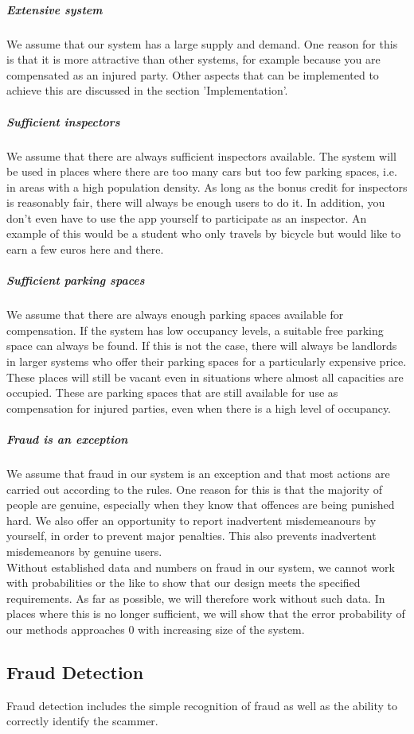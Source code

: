 \documentclass[
a4paper,     %
titlepage,   %
14pt         %
]{scrartcl}  %
\theoremstyle{mystyle}
\begin{document}
\subparagraph{Extensive system} We assume that our system has a large supply and demand. One reason for this is that it is more attractive than other systems, for example because you are compensated as an injured party. Other aspects that can be implemented to achieve this are discussed in the section 'Implementation'.

\subparagraph{Sufficient inspectors} We assume that there are always sufficient inspectors available. The system will be used in places where there are too many cars but too few parking spaces, i.e. in areas with a high population density. As long as the bonus credit for inspectors is reasonably fair, there will always be enough users to do it. In addition, you don't even have to use the app yourself to participate as an inspector. An example of this would be a student who only travels by bicycle but would like to earn a few euros here and there.

\subparagraph{Sufficient parking spaces} We assume that there are always enough parking spaces available for compensation. If the system has low occupancy levels, a suitable free parking space can always be found. If this is not the case, there will always be landlords in larger systems who offer their parking spaces for a particularly expensive price. These places will still be vacant even in situations where almost all capacities are occupied. These are parking spaces that are still available for use as compensation for injured parties, even when there is a high level of occupancy. 

\subparagraph{Fraud is an exception} We assume that fraud in our system is an exception and that most actions are carried out according to the rules. One reason for this is that the majority of people are genuine, especially when they know that offences are being punished hard. We also offer an opportunity to report inadvertent misdemeanours by yourself, in order to prevent major penalties. This also prevents inadvertent misdemeanors by genuine users.\\

Without established data and numbers on fraud in our system, we cannot work with probabilities or the like to show that our design meets the specified requirements. As far as possible, we will therefore work without such data. In places where this is no longer sufficient, we will show that the error probability of our methods approaches 0 with increasing size of the system.

\subsection{Fraud Detection}
Fraud detection includes the simple recognition of fraud as well as the ability to correctly identify the scammer.  \\
\end{document}
